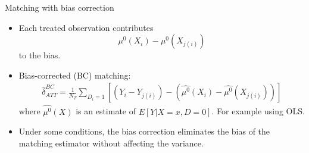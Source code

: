 \documentclass{beamer}
\begin{document}
\begin{frame}{Matching with bias correction}
	
	\begin{itemize}
	\item Each treated observation contributes$$\mu^0(X_i) - \mu^0(X_{j(i)})$$to the bias.
	\item Bias-corrected (BC) matching:
		\begin{eqnarray*}
		\widehat{\delta}_{ATT}^{BC} = \frac{1}{N_T} \sum_{D_i=1} \left[ (Y_i - Y_{j(i)}) - ( \widehat{\mu^0}(X_i) - \widehat{\mu^0}(X_{j(i)}) ) \right]
		\end{eqnarray*}where $\widehat{\mu^0}(X)$ is an estimate of $E[Y|X=x,D=0]$.  For example using OLS.  
	\item Under some conditions, the bias correction eliminates the bias of the matching estimator without affecting the variance.
	\end{itemize}
\end{frame}
\end{document}
